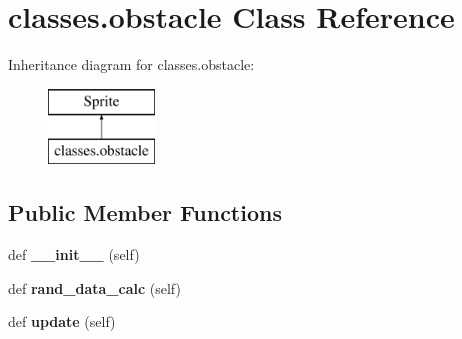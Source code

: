 \hypertarget{classclasses_1_1obstacle}{}\section{classes.\+obstacle Class Reference}
\label{classclasses_1_1obstacle}
Inheritance diagram for classes.\+obstacle\+:\begin{figure}[H]
\begin{center}
\leavevmode
\includegraphics[height=2.000000cm]{classclasses_1_1obstacle}
\end{center}
\end{figure}
\subsection*{Public Member Functions}
\begin{DoxyCompactItemize}
\item 
\hypertarget{classclasses_1_1obstacle_a1267f3775feb3a38993eaf7c06b70e0b}{}def {\bfseries \+\_\+\+\_\+init\+\_\+\+\_\+} (self)\label{classclasses_1_1obstacle_a1267f3775feb3a38993eaf7c06b70e0b}

\item 
\hypertarget{classclasses_1_1obstacle_a21704232a6fd57b771888202200302e7}{}def {\bfseries rand\+\_\+data\+\_\+calc} (self)\label{classclasses_1_1obstacle_a21704232a6fd57b771888202200302e7}

\item 
\hypertarget{classclasses_1_1obstacle_a7359254ed2a6b4f4860420c34a8dde11}{}def {\bfseries update} (self)\label{classclasses_1_1obstacle_a7359254ed2a6b4f4860420c34a8dde11}

\end{DoxyCompactItemize}
